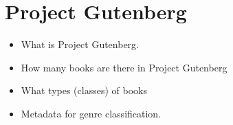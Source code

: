 \section{Project Gutenberg}
\begin{itemize}
    \item What is Project Gutenberg.
    \item How many books are there in Project Gutenberg
    \item What types (classes) of books
    \item Metadata for genre classification.
\end{itemize}
